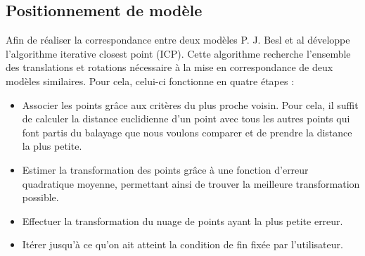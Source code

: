 \subsection{Positionnement de modèle}
Afin de réaliser la correspondance entre deux modèles P. J. Besl et al\cite{ICP} développe l'algorithme \og iterative closest point \fg (ICP).
Cette algorithme recherche l'ensemble des translations et rotations nécessaire à la mise en correspondance de deux modèles similaires. Pour cela,
celui-ci fonctionne en quatre étapes :
\begin{itemize}
  \item Associer les points grâce aux critères du plus proche voisin. Pour cela, il suffit de calculer la distance euclidienne d'un
   point avec tous les autres points qui font partis du balayage que nous voulons comparer et de prendre la distance la plus petite.
  \item Estimer la transformation des points grâce à une fonction d'erreur quadratique moyenne, permettant ainsi de trouver la meilleure
  transformation possible.
  \item Effectuer la transformation du nuage de points ayant la plus petite erreur.
  \item Itérer jusqu'à ce qu'on ait atteint la condition de fin fixée par l'utilisateur.
\end{itemize}

